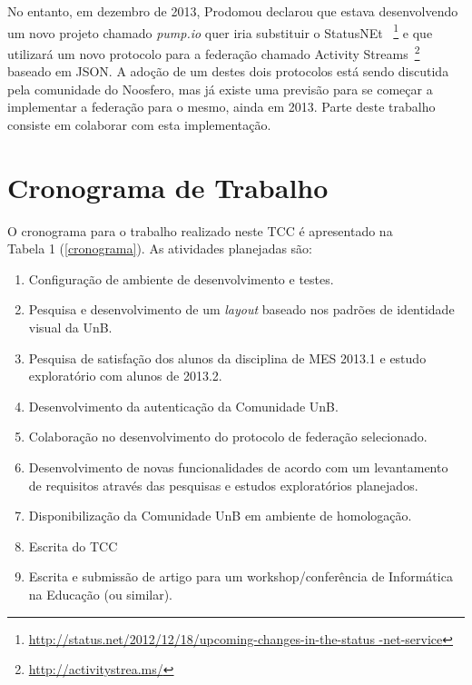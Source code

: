No entanto, em dezembro de 2013, Prodomou declarou que estava desenvolvendo
um novo projeto chamado \textit{pump.io} quer iria substituir o StatusNEt
~\footnote{\url{http://status.net/2012/12/18/upcoming-changes-in-the-status
-net-service}} e que utilizará um novo protocolo para a federação chamado
Activity Streams~\footnote{\url{http://activitystrea.ms/}} baseado em JSON.
A adoção de um destes dois protocolos está sendo discutida pela comunidade do
Noosfero, mas já existe uma previsão para se começar a implementar a federação
para o mesmo, ainda em 2013. Parte deste trabalho consiste em colaborar com esta
implementação.

\section{Cronograma de Trabalho}

O cronograma para o trabalho realizado neste TCC é apresentado na \\ Tabela 1 
(\ref{cronograma}). As atividades planejadas são:

\begin{enumerate}
	\item Configuração de ambiente de desenvolvimento e testes.
	\item Pesquisa e desenvolvimento de um \textit{layout} baseado nos
	padrões de identidade visual da UnB.
	\item Pesquisa de satisfação dos alunos da disciplina de MES 2013.1 e
	estudo exploratório com alunos de 2013.2.
	\item Desenvolvimento da autenticação da Comunidade UnB.
	\item Colaboração no desenvolvimento do protocolo de federação
	selecionado.
	\item Desenvolvimento de novas funcionalidades de acordo com um
	levantamento de requisitos através das pesquisas e estudos exploratórios
	planejados.
	\item Disponibilização da Comunidade UnB em ambiente de homologação.
	\item Escrita do TCC
	\item Escrita e submissão de artigo para um workshop/conferência de
	Informática na Educação (ou similar).
\end{enumerate}

